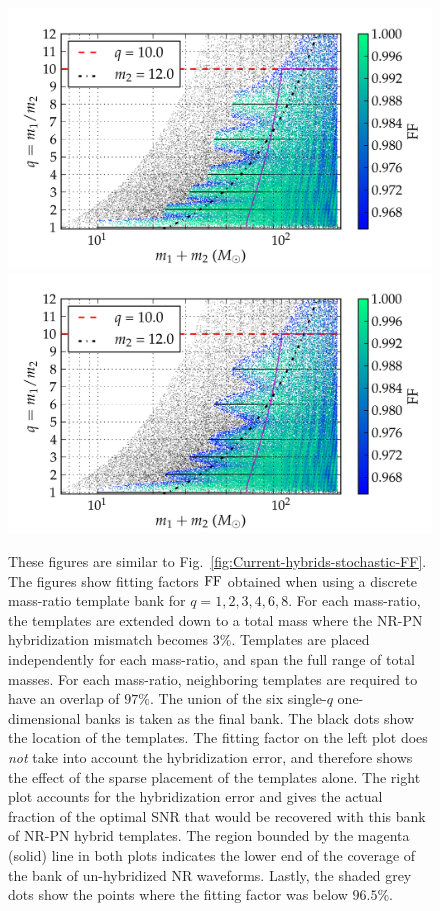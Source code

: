\begin{figure}
\begin{center}
\includegraphics[width=\columnwidth]{bank_26022013_02_mtot200_logMq_NOhybMM-tiny.png}
\includegraphics[width=\columnwidth]{bank_26022013_02_mtot200_logMq_hybMM-tiny.png}
\caption{\label{fig:Current-hybrids-FF}These figures are similar to 
  Fig.~\ref{fig:Current-hybrids-stochastic-FF}. The figures show fitting
  factors $\mathrm{FF}$ obtained when using a discrete mass-ratio template bank for
  $q=1,2,3,4,6,8$. For each mass-ratio, the templates are extended down 
  to a total mass where the NR-PN hybridization mismatch becomes
  $3\%$. Templates are placed independently for each mass-ratio, and span the 
  full range of total masses. For each mass-ratio, neighboring templates are 
  required to have an overlap of $97\%$. The union of the six single-$q$ 
  one-dimensional banks is taken as the final bank. The black dots show the 
  location of the templates. The fitting factor on the left plot does 
  {\em not} take into account the hybridization error, and therefore shows the
  effect of the sparse placement of the templates alone. The right plot accounts
  for the hybridization error
  and gives the actual fraction of the optimal SNR that would be recovered
  with this bank of NR-PN hybrid templates. The region bounded by the magenta 
  (solid) line in both plots indicates the lower end of the coverage of the 
  bank of un-hybridized NR waveforms. Lastly, the shaded grey dots show the 
  points where the fitting factor was below $96.5\%$.}
\end{center}
\end{figure}

